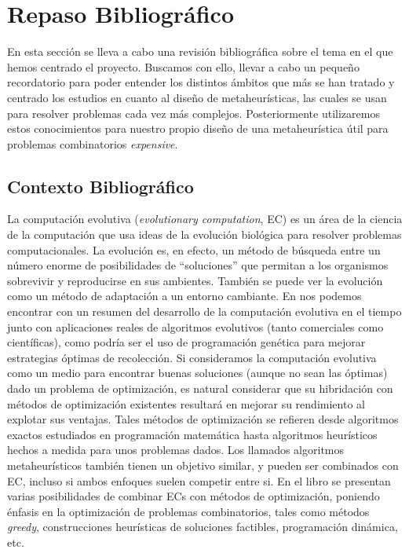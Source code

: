 \chapter{Repaso Bibliográfico}

En esta sección se lleva a cabo una revisión bibliográfica sobre el tema en el que hemos centrado el proyecto. 
Buscamos con ello, llevar a cabo un pequeño recordatorio para poder entender los distintos ámbitos que más se han tratado y centrado los estudios en cuanto al diseño de metaheurísticas, las cuales se usan para resolver problemas cada vez más complejos.  
Posteriormente utilizaremos estos conocimientos para nuestro propio diseño de una metaheurística útil para problemas combinatorios \textit{expensive}.


\section{Contexto Bibliográfico}


La computación evolutiva (\textit{evolutionary computation}, EC) es un área de la ciencia de la computación que usa ideas de la evolución biológica para resolver problemas computacionales. 
La evolución es, en efecto, un método de búsqueda entre un número enorme de posibilidades de ``soluciones'' que permitan a los organismos sobrevivir y reproducirse en sus ambientes. 
También se puede ver la evolución como un método de adaptación a un entorno cambiante. 
En \parencite{backEvolutionaryComputationOverview1996} nos podemos encontrar con un resumen del desarrollo de la computación evolutiva en el tiempo junto con aplicaciones reales de algoritmos evolutivos (tanto comerciales como científicas), como podría ser el uso de programación genética para mejorar estrategias óptimas de recolección. 
Si consideramos la computación evolutiva como un medio para encontrar buenas soluciones (aunque no sean las óptimas) dado un problema de optimización, es natural considerar que su hibridación con métodos de optimización existentes resultará en mejorar su rendimiento al explotar sus ventajas. 
Tales métodos de optimización se refieren desde algoritmos exactos estudiados en programación matemática \parencite{islamMATHEMATICALPROGRAMMING2020} hasta algoritmos heurísticos hechos a medida para unos problemas dados. 
Los llamados algoritmos metaheurísticos también tienen un objetivo similar, y pueden ser combinados con EC, incluso si ambos enfoques suelen competir entre si. 
En el libro \parencite{michalewiczHandbookEvolutionaryComputation1997} se presentan varias posibilidades de combinar ECs con métodos de optimización, poniendo énfasis en la optimización de problemas combinatorios, tales como métodos \textit{greedy}, construcciones heurísticas de soluciones factibles, programación dinámica, etc. 


